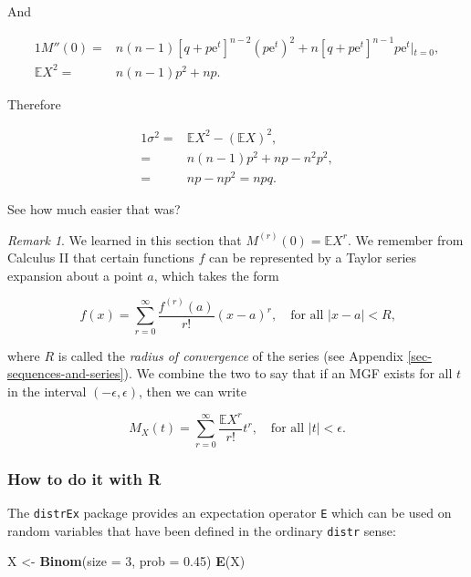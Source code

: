 \documentclass[]{book}
\newenvironment{Shaded}{\begin{snugshade}}{\end{snugshade}}
\newcommand{\KeywordTok}[1]{\textcolor[rgb]{0.13,0.29,0.53}{\textbf{{#1}}}}
\newcommand{\DataTypeTok}[1]{\textcolor[rgb]{0.13,0.29,0.53}{{#1}}}
\newcommand{\DecValTok}[1]{\textcolor[rgb]{0.00,0.00,0.81}{{#1}}}
\newcommand{\FloatTok}[1]{\textcolor[rgb]{0.00,0.00,0.81}{{#1}}}
\newcommand{\StringTok}[1]{\textcolor[rgb]{0.31,0.60,0.02}{{#1}}}
\newcommand{\NormalTok}[1]{{#1}}
\numberwithin{equation}{chapter}
\numberwithin{figure}{chapter}
\theoremstyle{plain}
\theoremstyle{definition}
\theoremstyle{remark}
\theoremstyle{definition}
\theoremstyle{definition}
\theoremstyle{remark}
\newtheorem*{remark}{Remark}
\begin{document}
And

\begin{alignat*}{1}
M''(0)= & n(n-1)[q+p\mathrm{e}^{t}]^{n-2}(p\mathrm{e}^{t})^{2}+n[q+p\mathrm{e}^{t}]^{n-1}p\mathrm{e}^{t}\left|_{t=0}\right.,\\
\mathbb{E} X^{2}= & n(n-1)p^{2}+np.
\end{alignat*}

Therefore

\begin{alignat*}{1}
\sigma^{2}= & \mathbb{E} X^{2}-(\mathbb{E} X)^{2},\\
= & n(n-1)p^{2}+np-n^{2}p^{2},\\
= & np-np^{2}=npq.
\end{alignat*}

See how much easier that was?

\bigskip

\begin{remark}
We learned in this section that \(M^{(r)}(0) = \mathbb{E} X^{r}\). We
remember from Calculus II that certain functions \(f\) can be
represented by a Taylor series expansion about a point \(a\), which
takes the form

\begin{equation}
f(x)=\sum_{r=0}^{\infty}\frac{f^{(r)}(a)}{r!}(x-a)^{r},\quad \mbox{for all \(|x-a| < R\),}
\end{equation}

where \(R\) is called the \emph{radius of convergence} of the series
(see Appendix \ref{sec-sequences-and-series}). We combine the two to say
that if an MGF exists for all \(t\) in the interval
\((-\epsilon,\epsilon)\), then we can write

\begin{equation}
M_{X}(t)=\sum_{r=0}^{\infty}\frac{\mathbb{E} X^{r}}{r!}t^{r},\quad \mbox{for all $|t|<\epsilon$.}
\end{equation}
\end{remark}

\subsubsection{How to do it with R}\label{how-to-do-it-with-r-22}

The \texttt{distrEx} package \autocite{distrEx} provides an expectation
operator \texttt{E} which can be used on random variables that have been
defined in the ordinary \texttt{distr} sense:

\begin{Shaded}
\begin{Highlighting}[]
\NormalTok{X <-}\StringTok{ }\KeywordTok{Binom}\NormalTok{(}\DataTypeTok{size =} \DecValTok{3}\NormalTok{, }\DataTypeTok{prob =} \FloatTok{0.45}\NormalTok{)}
\KeywordTok{E}\NormalTok{(X)}
\end{Highlighting}
\end{Shaded}
\end{document}

